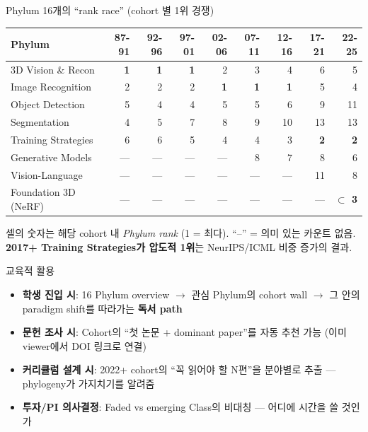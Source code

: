 \documentclass[aspectratio=169,t]{beamer}
\newcommand{\hot}[1]{\textcolor{accentorange}{\textbf{#1}}}
\newcommand{\cool}[1]{\textcolor{accentblue}{\textbf{#1}}}
\newcommand{\muted}[1]{\textcolor{mutedgray}{#1}}
\begin{document}
\begin{frame}{Phylum 16개의 ``rank race'' (cohort 별 1위 경쟁)}
\small
\begin{tabular}{@{}lrrrrrrrr@{}}
\toprule
\textbf{Phylum} & \textbf{87-91} & \textbf{92-96} & \textbf{97-01} & \textbf{02-06} & \textbf{07-11} & \textbf{12-16} & \textbf{17-21} & \textbf{22-25} \\
\midrule
3D Vision \& Recon  & \cool{1} & \cool{1} & \cool{1} & 2 & 3 & 4 & 6 & 5 \\
Image Recognition   & 2 & 2 & 2 & \cool{1} & \cool{1} & \cool{1} & 5 & 4 \\
Object Detection    & 5 & 4 & 4 & 5 & 5 & 6 & 9 & 11 \\
Segmentation        & 4 & 5 & 7 & 8 & 9 & 10 & 13 & 13 \\
Training Strategies & 6 & 6 & 5 & 4 & 4 & 3 & \cool{2} & \cool{2} \\
Generative Models   & — & — & — & — & 8 & 7 & 8 & 6 \\
Vision-Language     & — & — & — & — & — & — & 11 & 8 \\
Foundation 3D (NeRF)& — & — & — & — & — & — & — & \hot{$\subset$ 3} \\
\bottomrule
\end{tabular}
\vfill
\muted{셀의 숫자는 해당 cohort 내 \emph{Phylum rank} (1 = 최다). ``--'' = 의미 있는 카운트 없음.}\\
\hot{2017+ Training Strategies가 압도적 1위}는 NeurIPS/ICML 비중 증가의 결과.
\end{frame}

\begin{frame}{교육적 활용}
\begin{itemize}
  \item \cool{학생 진입 시}: 16 Phylum overview $\to$ 관심 Phylum의 cohort wall $\to$ 그 안의 paradigm shift를 따라가는 \hot{독서 path}
  \item \cool{문헌 조사 시}: Cohort의 ``첫 논문 + dominant paper''를 자동 추천 가능 (이미 viewer에서 DOI 링크로 연결)
  \item \cool{커리큘럼 설계 시}: 2022+ cohort의 ``꼭 읽어야 할 N편''을 분야별로 추출 — phylogeny가 가지치기를 알려줌
  \item \cool{투자/PI 의사결정}: Faded vs emerging Class의 비대칭 — 어디에 시간을 쓸 것인가
\end{itemize}
\end{frame}
\end{document}
